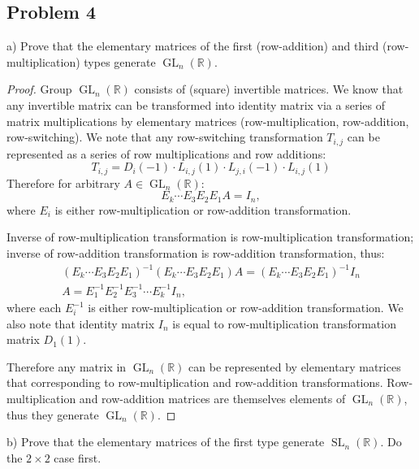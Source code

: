 \documentclass{article}
\newcommand{\R}{\mathbb{R}}
\newcommand{\GL}[2]{\operatorname{GL}_{#1}(#2)}
\newcommand{\GLnR}{\GL{n}{\R}}
\newcommand{\SL}[2]{\operatorname{SL}_{#1}(#2)}
\newcommand{\SLnR}{\SL{n}{\R}}
\begin{document}
\subsection*{Problem 4}

\begin{tcolorbox}
a) Prove that the elementary matrices of the first (row-addition) and third (row-multiplication) types generate $\GLnR$.
\end{tcolorbox}

\begin{proof}

Group $\GLnR$ consists of (square) invertible matrices.
We know that any invertible matrix can be transformed into identity matrix via a series of matrix multiplications by elementary matrices (row-multiplication, row-addition, row-switching). We note that any row-switching transformation $T_{i,j}$ can be represented as a series of row multiplications and row additions:
\[ T_{i,j} = D_i(-1) \cdot L_{i,j}(1) \cdot L_{j,i}(-1) \cdot L_{i,j}(1) \]
Therefore for arbitrary $A \in \GLnR$:
\[ E_k \cdots E_3 E_2 E_1 A = I_n, \]
where $E_i$ is either row-multiplication or row-addition transformation.

Inverse of row-multiplication transformation is row-multiplication transformation;
inverse of row-addition transformation is row-addition transformation, thus:
\begin{gather*}
    (E_k \cdots E_3 E_2 E_1)^{-1} (E_k \cdots E_3 E_2 E_1) A = (E_k \cdots E_3 E_2 E_1)^{-1} I_n \\
    A = E_1^{-1} E_2^{-1} E_3^{-1} \cdots E_k^{-1} I_n,
\end{gather*}
where each $E_i^{-1}$ is either row-multiplication or row-addition transformation.
We also note that identity matrix $I_n$ is equal to row-multiplication transformation matrix $D_1(1)$.

Therefore any matrix in $\GLnR$ can be represented by elementary matrices that corresponding to row-multiplication and row-addition transformations.
Row-multiplication and row-addition matrices are themselves elements of $\GLnR$, thus they generate $\GLnR$.

\end{proof}

\begin{tcolorbox}
b) Prove that the elementary matrices of the first type generate $\SLnR$.
Do the $2 \times 2$ case first.
\end{tcolorbox}
\end{document}
